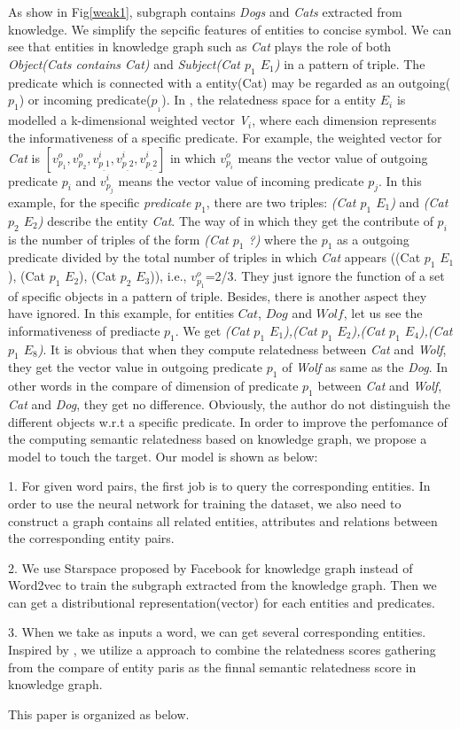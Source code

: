 As show in Fig\ref{weak1}, subgraph contains \emph{Dogs} and \emph{Cats} extracted from
knowledge. We simplify the sepcific features of entities to concise symbol. 
We can see that entities in knowledge graph such as \emph{Cat} plays the role 
of both \emph{Object(Cats contains Cat)} and \emph{Subject(Cat $p_1$ $E_1$)}
in a pattern of triple. The predicate which is connected with a entity(Cat)
may be regarded as an outgoing($p_1$) or incoming predicate($p_{_1}$).
In \cite{aaai/Pirro12}, the relatedness space for a entity ${E_i}$ is modelled a 
k-dimensional weighted vector \emph{V$_i$}, where each dimension represents
the informativeness of a specific predicate.
For example, the weighted vector for \emph{Cat} is 
$[v_{p_1}^o, v_{p_2}^o, v_{p_\_1}^i, v_{p_\_2}^i, v_{p_\_2}^i]$ in which $v_{p_i}^o$ 
means the vector value of outgoing predicate $p_i$ and $v_{p_j}^i$ 
means the vector value of incoming predicate $p_j$. 
In this example, for the specific \emph{predicate} $p_1$, there are two triples:
\emph{(Cat $p_1$ $E_1$)} and \emph{(Cat $p_2$ $E_2$)} describe the entity \emph{Cat}.
The way of \cite{aaai/Pirro12} in which they get the contribute of $p_i$ is the number
of triples of the form \emph{(Cat $p_1$ ?)} where the $p_1$ as a outgoing predicate
divided by the total number of triples in which \emph{Cat} appears
((Cat $p_1$ $E_1$), (Cat $p_1$ $E_2$), (Cat $p_2$ $E_3$)), i.e., $v_{p_1}^o$=2/3.
They just ignore the function of a set of specific objects in a pattern of triple.
Besides, there is another aspect they have ignored. In this example, for entities $Cat$,
$Dog$ and $Wolf$, let us see the informativeness of prediacte $p_1$. We get
\emph{{(Cat $p_1$ $E_1$),(Cat $p_1$ $E_2$),(Cat $p_1$ $E_4$),(Cat $p_1$ $E_8$)}}. 
It is obvious that when they compute relatedness between \emph{Cat} and \emph{Wolf}, they get the
vector value in outgoing predicate $p_1$ of \emph{Wolf} as same as the \emph{Dog}.
In other words in the compare of dimension of predicate $p_1$ between \emph{Cat} and \emph{Wolf},
\emph{Cat} and \emph{Dog}, they get no difference. Obviously, the author do not distinguish the different 
objects w.r.t a specific predicate. In order to improve the perfomance of the computing
semantic relatedness based on knowledge graph, we propose a model to touch 
the target. Our model is shown as below:

1. For given word pairs, the first job is to query the corresponding entities. In order to use the
neural network for training the dataset, we also need to construct a graph contains all related
entities, attributes and relations between the corresponding entity pairs.

2. We use Starspace proposed by Facebook for knowledge graph instead of Word2vec to train the subgraph
extracted from the knowledge graph. Then we can get a distributional representation(vector) for each
entities and predicates. 

3. When we take as inputs a word, we can get several corresponding entities.
Inspired by \cite{acl/IacobacciPN15}, we utilize a approach to combine the 
relatedness scores gathering from the compare of entity paris
as the finnal semantic relatedness score in knowledge graph.

This paper is organized as below. 